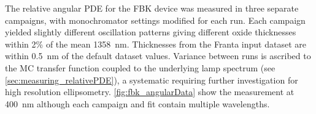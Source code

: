 The relative angular PDE for the FBK device was measured in three separate campaigns, with monochromator settings modified for each run. Each campaign yielded slightly different oscillation patterns giving different oxide thicknesses within 2\% of the mean 1358~nm. Thicknesses from the Franta input dataset are within 0.5~nm of the default dataset values. Variance between runs is ascribed to the MC transfer function coupled to the underlying lamp spectrum (see \autoref{sec:measuring_relativePDE}), a systematic requiring further investigation for high resolution ellipsometry. \autoref{fig:fbk_angularData} show the measurement at 400~nm although each campaign and fit contain multiple wavelengths.

 


